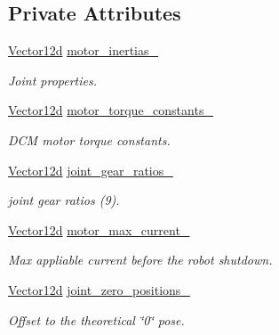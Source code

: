 \subsection*{Private Attributes}
\begin{DoxyCompactItemize}
\item 
\hyperlink{common__header_8hpp_a80313eb420184518596e745eecf4b494}{Vector12d} \hyperlink{classblmc__robots_1_1Solo12_a625a9e4fe0be2fcad91a670d12f18bf3}{motor\+\_\+inertias\+\_\+}
\begin{DoxyCompactList}\small\item\em Joint properties. \end{DoxyCompactList}\item 
\hyperlink{common__header_8hpp_a80313eb420184518596e745eecf4b494}{Vector12d} \hyperlink{classblmc__robots_1_1Solo12_a4bab49dbf3f7234b6e0d5166696c885a}{motor\+\_\+torque\+\_\+constants\+\_\+}
\begin{DoxyCompactList}\small\item\em D\+CM motor torque constants. \end{DoxyCompactList}\item 
\hyperlink{common__header_8hpp_a80313eb420184518596e745eecf4b494}{Vector12d} \hyperlink{classblmc__robots_1_1Solo12_a03d025b7fa51624e1de5865340429b9f}{joint\+\_\+gear\+\_\+ratios\+\_\+}
\begin{DoxyCompactList}\small\item\em joint gear ratios (9). \end{DoxyCompactList}\item 
\hyperlink{common__header_8hpp_a80313eb420184518596e745eecf4b494}{Vector12d} \hyperlink{classblmc__robots_1_1Solo12_a46cab41a223dc4ee824e6d192cc01f9d}{motor\+\_\+max\+\_\+current\+\_\+}
\begin{DoxyCompactList}\small\item\em Max appliable current before the robot shutdown. \end{DoxyCompactList}\item 
\hyperlink{common__header_8hpp_a80313eb420184518596e745eecf4b494}{Vector12d} \hyperlink{classblmc__robots_1_1Solo12_ad3d4f55c1a8d5c16aaacf5e870370f18}{joint\+\_\+zero\+\_\+positions\+\_\+}
\begin{DoxyCompactList}\small\item\em Offset to the theoretical \char`\"{}0\char`\"{} pose. \end{DoxyCompactList}\item 
\mbox{\label{classblmc__robots_1_1Solo12_a8eab2e983bfe76eafbcf054c385340a3}} 

\end{DoxyCompactItemize}
